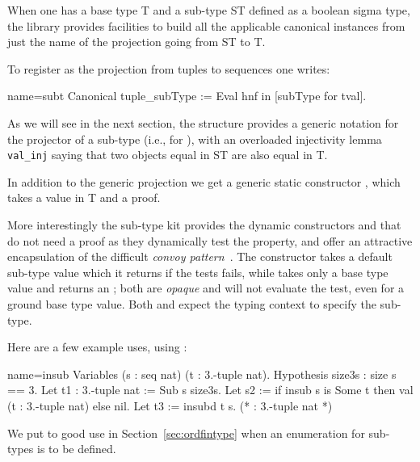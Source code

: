 \mcbREQUIRE{}

When one has a base type T and a sub-type ST defined as a boolean
sigma type, the \mcbMC{} library provides facilities to
build all the applicable canonical instances from just
the name of the projection going from ST to T.

To register  as the projection from tuples to sequences one
writes:

\begin{coq}{name=subt}{}
Canonical tuple_subType := Eval hnf in [subType for tval].
\end{coq}

As we will see in the next section, the  structure provides
a generic notation  for the projector of a sub-type (i.e.,
 for ), with an overloaded injectivity lemma
\lstinline/val_inj/ saying that two objects equal in ST are also equal
in T.

In addition to the generic projection we get a generic static
constructor , which takes a value in T and a proof.

More interestingly the sub-type kit provides the dynamic constructors 
 and  that do not need a proof as they dynamically
test the property, and offer 
an attractive encapsulation of the difficult \emph{convoy
pattern}~\cite[Section 8.4]{CPDT}.
The  constructor takes a default
sub-type value which it returns if the tests fails, while 
takes only a base type value and returns an ; both are
\emph{opaque} and will not evaluate the test, even for a ground base
type value.  Both  and  expect the typing context to
specify the sub-type.

Here are a few example uses, using :

\begin{coq}{name=insub}{}
Variables (s : seq nat) (t : 3.-tuple nat).
Hypothesis size3s : size s == 3.
Let t1 : 3.-tuple nat := Sub s size3s.
Let s2 := if insub s is Some t then val (t : 3.-tuple nat) else nil.
Let t3 := insubd t s. (* : 3.-tuple nat *)
\end{coq}

We put  to good use in Section~\ref{sec:ordfintype} when
an enumeration for sub-types is to be defined.

